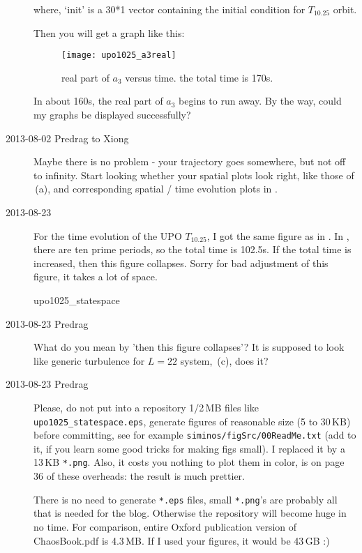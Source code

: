 \begin{description}
where, `init' is a 30*1 vector containing the initial condition for $T_{10.25}$
orbit.

Then you will get a graph like this:
\begin{figure}[h]
 \centering
 \captionsetup{width=.6\textwidth}
 \texttt{[image: upo1025\_a3real]}
 \caption{real part of $a_3$ versus time. the total time is 170s.}
 \label{xiong_upo1025_a3real}
\end{figure}

In about 160s, the real part of $a_3$ begins to run away.
By the way, could my graphs be displayed successfully?

\item[2013-08-02 Predrag to Xiong]
Maybe there is no problem - your trajectory goes somewhere, but
not off to infinity. Start looking whether your spatial plots look right, like
those of \,(a), and corresponding spatial / time evolution
plots in .

\item[2013-08-23 \XD]
For the time evolution of the UPO $T_{10.25}$, I got the same figure as in
. In , there are ten
prime periods, so the total time is 102.5s. If the total time is increased,
then this figure collapses. Sorry for bad adjustment of this figure, it takes
a lot of space.

{upo1025_statespace}

\item[2013-08-23 Predrag]
What do you mean by 'then this figure collapses'?
It is supposed to look like generic turbulence for
$L=22$ system, \,(c), does it?

\item[2013-08-23 Predrag]
Please, do not put into a repository 1/2\,MB files like
\\
\texttt{upo1025\_statespace.eps},
generate figures of reasonable size (5 to 30\,KB) before committing,
see for example \texttt{siminos/figSrc/00ReadMe.txt}
(add to it, if you learn some good tricks for making figs small).
I replaced it by a 13\,KB \texttt{*.png}. Also, it costs you nothing
to plot them in color, is on page 36 of
{these overheads}: the result is much prettier.

There is no need to generate \texttt{*.eps} files, small \texttt{*.png}'s are probably all
that is needed for the blog. Otherwise
the repository will become huge in no time. For comparison, entire Oxford publication
version of ChaosBook.pdf
is 4.3\,MB. If I used your figures, it would be 43\,GB :)


\end{description}
